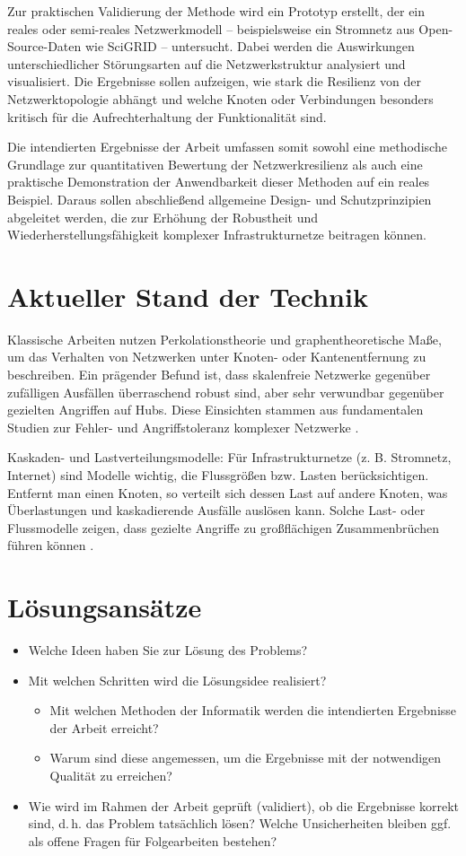 \documentclass[12pt]{article} %
\begin{document}
Zur praktischen Validierung der Methode wird ein Prototyp erstellt, der ein reales oder semi-reales Netzwerkmodell – beispielsweise ein Stromnetz aus Open-Source-Daten wie SciGRID – untersucht. Dabei werden die Auswirkungen unterschiedlicher Störungsarten auf die Netzwerkstruktur analysiert und visualisiert. Die Ergebnisse sollen aufzeigen, wie stark die Resilienz von der Netzwerktopologie abhängt und welche Knoten oder Verbindungen besonders kritisch für die Aufrechterhaltung der Funktionalität sind.

Die intendierten Ergebnisse der Arbeit umfassen somit sowohl eine methodische Grundlage zur quantitativen Bewertung der Netzwerkresilienz als auch eine praktische Demonstration der Anwendbarkeit dieser Methoden auf ein reales Beispiel. Daraus sollen abschließend allgemeine Design- und Schutzprinzipien abgeleitet werden, die zur Erhöhung der Robustheit und Wiederherstellungsfähigkeit komplexer Infrastrukturnetze beitragen können.

\section{Aktueller Stand der Technik}
Klassische Arbeiten nutzen Perkolationstheorie und graphentheoretische Maße, um das Verhalten von Netzwerken unter Knoten- oder Kantenentfernung zu beschreiben. Ein prägender Befund ist, dass skalenfreie Netzwerke gegenüber zufälligen Ausfällen überraschend robust sind, aber sehr verwundbar gegenüber gezielten Angriffen auf Hubs. Diese Einsichten stammen aus fundamentalen Studien zur Fehler- und Angriffstoleranz komplexer Netzwerke \cite{albert2000error}.

Kaskaden- und Lastverteilungsmodelle: Für Infrastrukturnetze (z. B. Stromnetz, Internet) sind Modelle wichtig, die Flussgrößen bzw. Lasten berücksichtigen. Entfernt man einen Knoten, so verteilt sich dessen Last auf andere Knoten, was Überlastungen und kaskadierende Ausfälle auslösen kann. Solche Last- oder Flussmodelle zeigen, dass gezielte Angriffe zu großflächigen Zusammenbrüchen führen können \cite{buldyrev2010catastrophic}.

\section{Lösungsansätze}
\begin{itemize}
    \item Welche Ideen haben Sie zur Lösung des Problems?
    \item Mit welchen Schritten wird die Lösungsidee realisiert?
    \begin{itemize}
        \item Mit welchen Methoden der Informatik werden die intendierten Ergebnisse der Arbeit erreicht?
        \item Warum sind diese angemessen, um die Ergebnisse mit der notwendigen Qualität zu erreichen?
    \end{itemize}
    \item Wie wird im Rahmen der Arbeit geprüft (validiert), ob die Ergebnisse korrekt sind, d.\,h. das Problem tatsächlich lösen? Welche Unsicherheiten bleiben ggf. als offene Fragen für Folgearbeiten bestehen?
\end{itemize}
\end{document}
